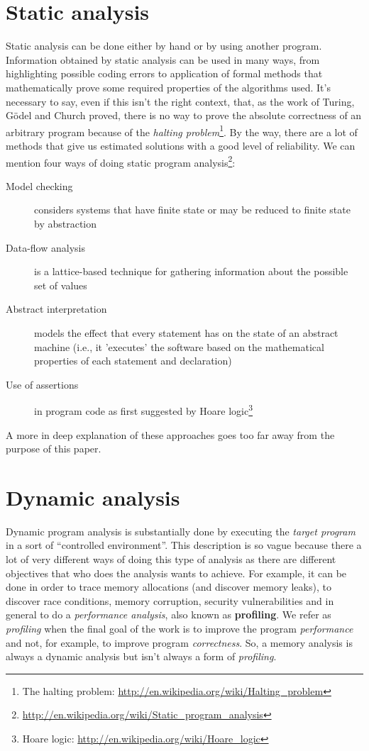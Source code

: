 \documentclass[a4paper,11pt]{report}
\begin{document}
\section{Static analysis}

Static analysis can be done either by hand or by using another program. Information obtained by static analysis can be used in many ways, from highlighting possible coding errors to application of formal methods that mathematically prove some required properties of the algorithms used. It's necessary to say, even if this isn't the right context, that, as the work of Turing, G\"{o}del and Church proved, there is no way to prove the absolute correctness of an arbitrary program because of the \emph{halting problem}\footnote{The halting problem: \url{http://en.wikipedia.org/wiki/Halting_problem}}.
By the way, there are a lot of methods that give us estimated solutions with a good level of reliability. We can mention four ways of doing static program
analysis\footnote{\url{http://en.wikipedia.org/wiki/Static_program_analysis}}:


\begin{description}
\item[Model checking] considers systems that have finite state or may be reduced to finite state by abstraction
\item[Data-flow analysis] is a lattice-based technique for gathering information about the possible set of values
\item[Abstract interpretation] models the effect that every statement has on the state of an abstract machine (i.e., it 'executes' the software based on the mathematical properties of each statement and declaration)
\item[Use of assertions] in program code as first suggested by Hoare logic\footnote{Hoare logic: \url{http://en.wikipedia.org/wiki/Hoare_logic}}
\end{description}

A more in deep explanation of these approaches goes too far away from the purpose of this paper.

\section{Dynamic analysis}

Dynamic program analysis is substantially done by executing the \emph{target program} in a sort of ``controlled environment''.
This description is so vague because there a lot of very different ways of doing this type of analysis as there are different objectives that who does the analysis wants to achieve. For example, it can be done in order to trace memory allocations (and discover memory leaks), to discover race conditions, memory corruption, security vulnerabilities and in general to do a \emph{performance analysis}, also known as \textbf{profiling}. We refer as \emph{profiling} when the final goal of the work is to improve the program  \emph{performance} and not, for example, to improve program \emph{correctness}. So, a memory analysis is always a dynamic analysis but isn't always a form of \emph{profiling}.
\end{document}
